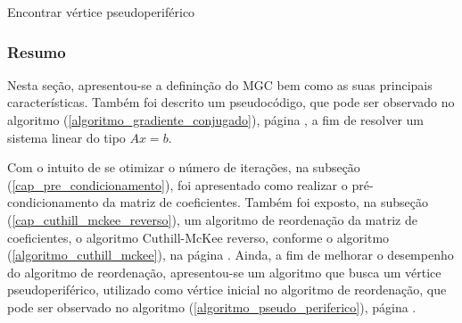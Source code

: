 \begin{algorithm}
\caption{Encontrar v\'ertice pseudoperif\'erico}
\label{algoritmo_pseudo_periferico}
\end{algorithm}  

\subsubsection{Resumo} \label{cap_conclusao}

Nesta seção, apresentou-se a defininção do MGC bem como as suas principais características. Também foi descrito um pseudocódigo, que pode ser observado no algoritmo (\ref{algoritmo_gradiente_conjugado}), página \pageref{algoritmo_gradiente_conjugado}, a fim de resolver um sistema linear do tipo $Ax = b$. 

Com o intuito de se otimizar o número de iterações, na subseção (\ref{cap_pre_condicionamento}), foi apresentado como realizar o pré-condicionamento da matriz de coeficientes. Também foi exposto, na subseção (\ref{cap_cuthill_mckee_reverso}), um algoritmo de reordenação da matriz de coeficientes, o algoritmo Cuthill-McKee reverso, conforme o algoritmo (\ref{algoritmo_cuthill_mckee}), na página \pageref{algoritmo_cuthill_mckee}. Ainda, a fim de melhorar o desempenho do algoritmo de reordenação, apresentou-se um algoritmo que busca um vértice pseudoperiférico, utilizado como vértice inicial no algoritmo de reordenação, que pode ser observado no algoritmo (\ref{algoritmo_pseudo_periferico}), página \pageref{algoritmo_pseudo_periferico}.
